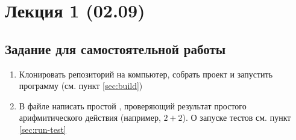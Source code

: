 \section{Лекция 1 (02.09)}


\subsection{Задание для самостоятельной работы}
\begin{enumerate}
\item Клонировать репозиторий  на компьютер,
      собрать проект и запустить программу  (см. пункт \ref{sec:build})
\item В файле  написать простой , проверяющий результат простого арифмитического действия (например, $2 + 2$).
      О запуске тестов см. пункт \ref{sec:run-test}
\end{enumerate}
